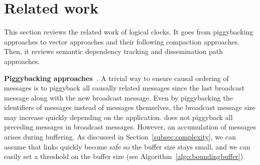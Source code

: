 
\section{Related work}
\label{sec:relatedwork}

This section reviews the related work of logical clocks. It goes from
piggybacking approaches to vector approaches and their following compaction
approaches. Then, it reviews semantic dependency tracking and dissemination path
approaches.

\noindent \textbf{Piggybacking
  approaches~\cite{birman1987reliable,hadzilacos1993fault}}. A trivial way to
ensure causal ordering of messages is to piggyback all causally related messages
since the last broadcast message along with the new broadcast message. Even by
piggybacking the identifiers of messages instead of messages themselves, the
broadcast message size may increase quickly depending on the
application. \CBROADCAST does not piggyback all preceding messages in broadcast
messages. However, an accumulation of messages arises during buffering. As
discussed in Section~\ref{subsec:complexity}, we can assume that links quickly
become safe so the buffer size stays small, and we can easily set a threshold on
the buffer size (see Algorithm~\ref{algo:boundingbuffer}).

